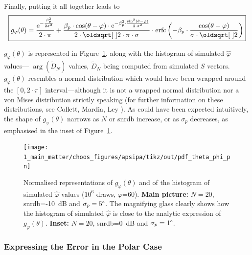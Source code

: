 Finally, putting it all together leads to
\begin{equation}
	\boxed{
		g_\varphi(\theta) = \frac{\e^{-\frac{\beta_p^2}{2 \sigma^2}}}{2\cdot \pi} + \frac{\beta_p \cdot \cos(\theta-\varphi) \cdot \e^{-\beta_p^2 \cdot \frac{\sin^2(\theta - \varphi)}{2\cdot \sigma^2}}}{2 \cdot \sqrt{2 \cdot \pi} \cdot \sigma}
		\cdot \erfc\left(- \beta_p \cdot \frac{\cos(\theta - \varphi)}{\sigma \cdot \sqrt{2}}\right)
	}
\end{equation}

$g_\varphi(\theta)$ is represented in Figure~\ref{fig:choos:apsipa:pdf_theta_phi}, along with the histogram of simulated $\widehat{\varphi}$ values---\ie{} $\arg (\widetilde{D}_N)$ values, $\widetilde{D}_N$ being computed from simulated $S$ vectors. $g_\varphi(\theta)$ resembles a normal distribution which would have been wrapped around the $\left[0,2\cdot\pi\right]$ interval---although it is not a wrapped normal distribution nor a von Mises distribution strictly speaking (for further information on these distributions, see Collett, Mardia, Ley \etal{}\cite{collett1981, mardia2000directional, ley2017modern}). As could have been expected intuitively, the shape of $g_\varphi(\theta)$ narrows as $N$ or \gls{snrdb} increase, or as $\sigma_p$ decreases, as emphasised in the inset of Figure~\ref{fig:choos:apsipa:pdf_theta_phi}.

\begin{figure}
	\centering
	\texttt{[image: 1\_main\_matter/choos\_figures/apsipa/tikz/out/pdf\_theta\_phi\_pn]}
	\caption[Normalised representations of $g_\varphi(\theta)$ and of the histogram of simulated $\widehat{\varphi}$ values.]{Normalised representations of $g_\varphi(\theta)$ and of the histogram of simulated $\widehat{\varphi}$ values ($10^6$ draws, $\varphi$=60{\degree}). \textbf{Main picture:} $N=20$, \gls{snrdb}=-10~dB and $\sigma_p=5{\degree}$. The magnifying glass clearly shows how the histogram of simulated $\widehat{\varphi}$ is close to the analytic expression of $g_\varphi(\theta)$. \textbf{Inset:} $N=20$, \gls{snrdb}=0~dB and $\sigma_p=1{\degree}$.}
	\label{fig:choos:apsipa:pdf_theta_phi}
\end{figure}

\subsubsection{Expressing the Error in the Polar Case}


